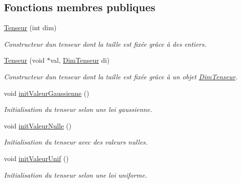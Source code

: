 \subsection*{Fonctions membres publiques}
\begin{DoxyCompactItemize}
\item 
\hyperlink{classTenseur_a936de784ba6d02e78456091b857c90d2}{Tenseur} (int dim)
\begin{DoxyCompactList}\small\item\em Constructeur d\textquotesingle{}un tenseur dont la taille est fixée grâce à des entiers. \end{DoxyCompactList}\item 
\mbox{\label{classTenseur_a6a39e895e161502a104b28e108d5923e}} 
\hyperlink{classTenseur_a6a39e895e161502a104b28e108d5923e}{Tenseur} (void $\ast$val, \hyperlink{classDimTenseur}{Dim\+Tenseur} di)
\begin{DoxyCompactList}\small\item\em Constructeur d\textquotesingle{}un tenseur dont la taille est fixée grâce à un objet \hyperlink{classDimTenseur}{Dim\+Tenseur}. \end{DoxyCompactList}\item 
\mbox{\label{classTenseur_ad8c217e97370fbe4fabe47c792f976a0}} 
void \hyperlink{classTenseur_ad8c217e97370fbe4fabe47c792f976a0}{init\+Valeur\+Gaussienne} ()
\begin{DoxyCompactList}\small\item\em Initialisation du tenseur selon une loi gaussienne. \end{DoxyCompactList}\item 
\mbox{\label{classTenseur_ad56d975cf6954e6e38116b82bc4aca3a}} 
void \hyperlink{classTenseur_ad56d975cf6954e6e38116b82bc4aca3a}{init\+Valeur\+Nulle} ()
\begin{DoxyCompactList}\small\item\em Initialisation du tenseur avec des valeurs nulles. \end{DoxyCompactList}\item 
\mbox{\label{classTenseur_aba025d1b39fd6de6dba44b9ed4bc865a}} 
void \hyperlink{classTenseur_aba025d1b39fd6de6dba44b9ed4bc865a}{init\+Valeur\+Unif} ()
\begin{DoxyCompactList}\small\item\em Initialisation du tenseur selon une loi uniforme. \end{DoxyCompactList}\item 

\end{DoxyCompactItemize}
